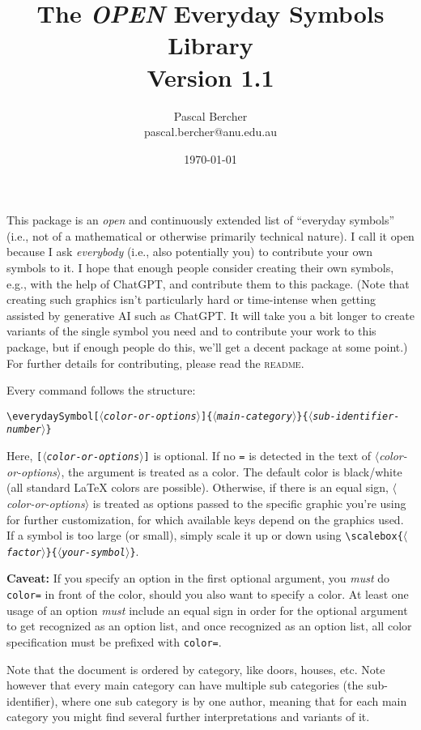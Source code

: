 \documentclass{article}
\newcommand{\meta}[1]{$\langle$\textit{\textrm{#1}}$\rangle$}
\newcommand{\marg}[1]{\texttt{\{\meta{#1}\}}}
\newcommand{\oarg}[1]{\texttt{[\meta{#1}]}}
\newcommand{\cs}[1]{\texttt{\textbackslash#1}}
\begin{document}
\title{The \emph{OPEN} Everyday Symbols Library\\[1ex]\large Version 1.1}
\author{Pascal Bercher\\pascal.bercher@anu.edu.au}
\date{\today}

\maketitle

This package is an \emph{open} and continuously extended list of ``everyday symbols'' (i.e., not of a mathematical or otherwise primarily technical nature). I call it open because I ask \emph{everybody} (i.e., also potentially you) to contribute your own symbols to it. I hope that enough people consider creating their own symbols, e.g., with the help of ChatGPT, and contribute them to this package. (Note that creating such graphics isn't particularly hard or time-intense when getting assisted by generative AI such as ChatGPT. It will take you a bit longer to create variants of the single symbol you need and to contribute your work to this package, but if enough people do this, we'll get a decent package at some point.) For further details for contributing, please read the \textsc{readme}.

Every command follows the structure:
\begin{center}
  \cs{everydaySymbol}\oarg{color-or-options}\marg{main-category}\marg{sub-identifier-number}
\end{center}
Here, \oarg{color-or-options} is optional. If no \verb+=+ is detected in the text of \meta{color-or-options}, the argument is treated as a color. The default color is black/white (all standard \LaTeX{} colors are possible). Otherwise, if there is an equal sign, \meta{color-or-options} is treated as options passed to the specific graphic you're using for further customization, for which available keys depend on the graphics used. If a symbol is too large (or small), simply scale it up or down using
\cs{scalebox}\marg{factor}\marg{your-symbol}.

\textbf{Caveat:} If you specify an option in the first optional argument, you \emph{must} do \verb+color=+ in front of the color, should you also want to specify a color. At least one usage of an option \emph{must} include an equal sign in order for the optional argument to get recognized as an option list, and once recognized as an option list, all color specification must be prefixed with \verb|color=|.

Note that the document is ordered by category, like doors, houses, etc. Note however that every main category can have multiple sub categories (the sub-identifier), where one sub category is by one author, meaning that for each main category you might find several further interpretations and variants of it. 
\end{document}
